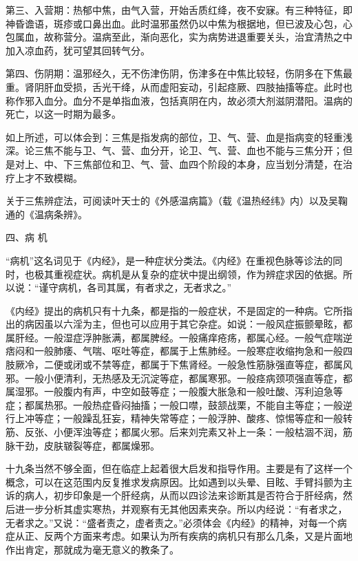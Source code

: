 \documentclass[12pt,UTF8]{ctexbook}
\begin{document}
第三、入营期：热郁中焦，由气入营，开始舌质红绛，夜不安寐。有三种特征，即神昏谵语，斑疹或口鼻出血。此时温邪虽然仍以中焦为根据地，但已波及心包，心包属血，故称营分。温病至此，渐向恶化，实为病势进退重要关头，治宜清热之中加入凉血药，犹可望其回转气分。

第四、伤阴期：温邪经久，无不伤津伤阴，伤津多在中焦比较轻，伤阴多在下焦最重。肾阴肝血受损，舌光干绛，从而虚阳妄动，引起痉厥、四肢抽搐等症。此时也称作邪入血分。血分不是单指血液，包括真阴在内，故必须大剂滋阴潜阳。温病的死亡，以这一时期为最多。

如上所述，可以体会到：三焦是指发病的部位，卫、气、营、血是指病变的轻重浅深。论三焦不能与卫、气、营、血分开，论卫、气、营、血也不能与三焦分开；但是对上、中、下三焦部位和卫、气、营、血四个阶段的本身，应当划分清楚，在治疗上才不致模糊。

关于三焦辨症法，可阅读叶天士的《外感温病篇》（载《温热经纬》内）以及吴鞠通的《温病条辨》。

四、病 机

“病机”这名词见于《内经》，是一种症状分类法。《内经》在重视色脉等诊法的同时，也极其重视症状。病机是从复杂的症状中提出纲领，作为辨症求因的依据。所以说：“谨守病机，各司其属，有者求之，无者求之。”

《内经》提出的病机只有十九条，都是指的一般症状，不是固定的一种病。它所指出的病因虽以六淫为主，但也可以应用于其它杂症。如说：一般风症振颤晕眩，都属肝经。一般湿症浮肿胀满，都属脾经。一般痛痒疮疡，都属心经。一般气症喘逆痞闷和一般肺痿、气喘、呕吐等症，都属于上焦肺经。一般寒症收缩拘急和一般四肢厥冷，二便或闭或不禁等症，都属于下焦肾经。一般急性筋脉强直等症，都属风邪。一般小便清利，无热感及无沉淀等症，都属寒邪。一般痉病颈项强直等症，都属湿邪。一般腹内有声，中空如鼓等症；一般腹大胀急和一般吐酸、泻利迫急等症；都属热邪。一般热症昏闷抽搐；一般口噤，鼓颔战栗，不能自主等症；一般逆行上冲等症；一般躁乱狂妄，精神失常等症；一般浮肿、酸疼、惊惕等症和一般转筋、反张、小便浑浊等症；都属火邪。后来刘完素又补上一条：一般枯涸不润，筋脉干劲，皮肤皲裂等症，都属燥邪。

十九条当然不够全面，但在临症上起着很大启发和指导作用。主要是有了这样一个概念，可以在这范围内反复推求发病原因。比如遇到以头晕、目眩、手臂抖颤为主诉的病人，初步印象是一个肝经病，从而以四诊法来诊断其是否符合于肝经病，然后进一步分析其虚实寒热，并观察有无其他因素夹杂。所以内经说：“有者求之，无者求之。”又说：“盛者责之，虚者责之。”必须体会《内经》的精神，对每一个病症从正、反两个方面来考虑。如果认为所有疾病的病机只有那么几条，又是片面地作出肯定，那就成为毫无意义的教条了。
\end{document}
